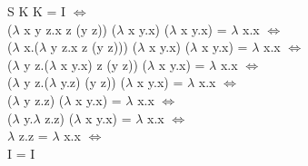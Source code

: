 \documentclass[12pt]{article}
\begin{document}
    S K K = I $\Longleftrightarrow$\\
    ($\lambda$ x y z.x z (y z)) ($\lambda$ x y.x) ($\lambda$ x y.x) = $\lambda$ x.x $\Longleftrightarrow$\\
    ($\lambda$ x.($\lambda$ y z.x z (y z))) ($\lambda$ x y.x)
    ($\lambda$ x y.x) = $\lambda$ x.x $\Longleftrightarrow$\\
    ($\lambda$ y z.($\lambda$ x y.x) z (y z)) ($\lambda$ x y.x)
    = $\lambda$ x.x $\Longleftrightarrow$\\
    ($\lambda$ y z.($\lambda$ y.z) (y z)) ($\lambda$ x y.x) = $\lambda$ x.x $\Longleftrightarrow$\\
    ($\lambda$ y z.z) ($\lambda$ x y.x) = $\lambda$ x.x $\Longleftrightarrow$\\
    ($\lambda$ y.$\lambda$ z.z) ($\lambda$ x y.x) = $\lambda$ x.x $\Longleftrightarrow$\\
    $\lambda$ z.z = $\lambda$ x.x $\Longleftrightarrow$\\
    I = I
\end{document}
